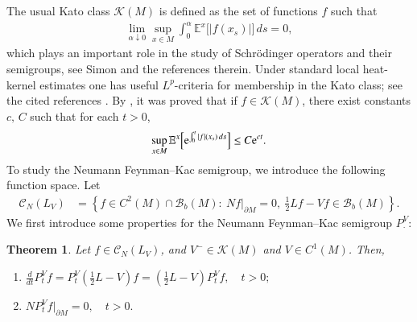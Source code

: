 \documentclass[11pt,twoside, reqno]{article}
\def\e{{\rm e}}
\newcommand\1{\mathbbm{1}}
\newcommand\E{\mathbb{E}}
\newtheorem{theorem}{Theorem}[section]
\theoremstyle{definition}
\numberwithin{equation}{section}
\def \e{{\rm e}}
\begin{document}
The usual Kato class $\mathcal{K}(M)$ is defined as the set of functions $f$ such that
\begin{align}\label{Kato-def}
\lim_{\alpha\downarrow  0} \sup_{x\in M}  \int_0^{\alpha} \E^x\bigl[|f(x_s)|\bigr] \, ds=0,
\end{align}
which  plays an important role in the study of Schr\"{o}dinger
operators and their semigroups, see Simon  \cite{Simon}  and the references therein. Under standard local heat-kernel estimates one has useful $L^p$-criteria for membership in the Kato class; see the cited references  \cite{Gu2017,GP15}.
By \cite[Lemma 3.9]{GP15}, it was proved that if $f\in \mathcal{K}(M)$, there exist constants
$c, \, C$ such that  for each $t>0$, 
\begin{align*}
\sup_{x\in M}\E^x\Bigl[ \e^{\int_0^t |f|(x_s)\, ds}\Bigr] \leq C\e^{ct}.
\end{align*}
To study the Neumann Feynman--Kac semigroup, we introduce the following  function space. 
Let
\begin{align*}
\mathcal{C}_{N}(L_V) &= \left\{ f \in C^2(M)\cap \mathcal{B}_b(M):\ Nf|_{\partial M} = 0,\ \frac{1}{2}Lf-Vf \in \mathcal{B}_b(M) \right\}.
\end{align*}
We first introduce some properties for the Neumann Feynman--Kac  semigroup $P_{\cdot}^V$:
\begin{theorem}\label{FK-prop}
Let \( f \in \mathcal{C}_N(L_V) \),  and $V^-\in \mathcal{K}(M)$ and $V\in  C^1(M)$. Then, 
\begin{enumerate}
    \item[(1)] \( \frac{d}{dt}P_t^V f = P^V_t (\frac{1}{2}L-V) f = (\frac{1}{2}L-V) P^V_t f, \quad t > 0; \)
    \item[(2)] \( N P_t^V f|_{\partial M} = 0, \quad t > 0. \)
\end{enumerate}
\end{theorem}
\end{document}
